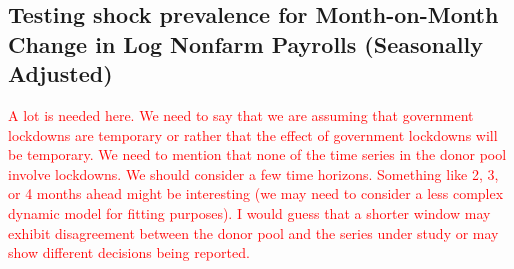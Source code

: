 \documentclass[11pt]{article}
\def\mbf#1{\mathbf{#1}} %
\theoremstyle{definition}
\begin{document}


\subsection{Testing shock prevalence for Month-on-Month Change in Log Nonfarm Payrolls (Seasonally Adjusted)}

\label{sptuem}

\textcolor{red}{A lot is needed here. We need to say that we are assuming that government lockdowns are temporary or rather that the effect of government lockdowns will be temporary. We need to mention that none of the time series in the donor pool involve lockdowns. We should consider a few time horizons. Something like 2, 3, or 4 months ahead might be interesting (we may need to consider a less complex dynamic model for fitting purposes). I would guess that a shorter window may exhibit disagreement between the donor pool and the series under study or may show different decisions being reported. }
\end{document}

